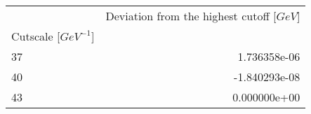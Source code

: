 \begin{tabular}{lr}
\toprule
{} &  Deviation from the highest cutoff [$GeV$] \\
Cutscale [$GeV^{-1}$] &                                            \\
\midrule
37                    &                               1.736358e-06 \\
40                    &                              -1.840293e-08 \\
43                    &                               0.000000e+00 \\
\bottomrule
\end{tabular}
